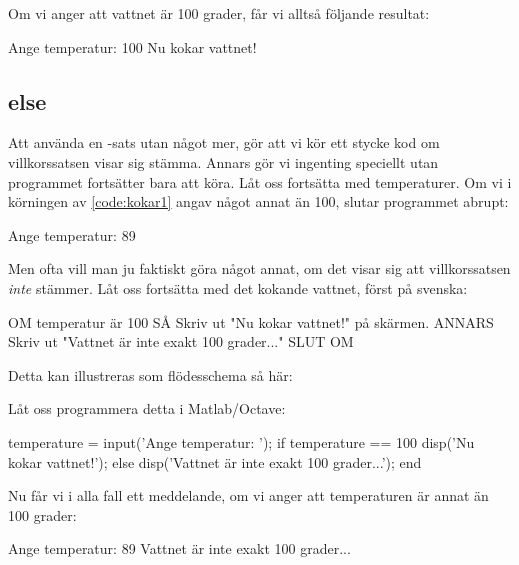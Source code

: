 Om vi anger att vattnet är 100 grader, får vi alltså följande resultat:

\vspace{10pt}
\begin{matlab}
Ange temperatur: 100
Nu kokar vattnet!
\end{matlab}

\subsection{else}
Att använda en -sats utan något mer, gör att vi kör ett stycke kod om villkorssatsen visar sig stämma. Annars gör vi ingenting speciellt utan programmet fortsätter bara att köra. Låt oss fortsätta med temperaturer. Om vi i körningen av \autoref{code:kokar1} angav något annat än 100, slutar programmet abrupt:

\vspace{10pt}
\begin{matlab}
Ange temperatur: 89
\end{matlab}

Men ofta vill man ju faktiskt göra något annat, om det visar sig att villkorssatsen \emph{inte} stämmer. Låt oss fortsätta med det kokande vattnet, först på svenska:

\begin{pseudo}
OM temperatur är 100 SÅ
   Skriv ut "Nu kokar vattnet!" på skärmen.
ANNARS
   Skriv ut "Vattnet är inte exakt 100 grader..."
SLUT OM
\end{pseudo}
\newpage
Detta kan illustreras som flödesschema så här:


 Låt oss programmera detta i Matlab/Octave:

\begin{matlab}[caption={Vår första else-sats},label={}]
temperature = input('Ange temperatur: ');
if temperature == 100
    disp('Nu kokar vattnet!');
else
    disp('Vattnet är inte exakt 100 grader...');
end
\end{matlab}

Nu får vi i alla fall ett meddelande, om vi anger att temperaturen är annat än 100 grader:

\vspace{10pt}
\begin{matlab}
Ange temperatur: 89
Vattnet är inte exakt 100 grader...
\end{matlab}

